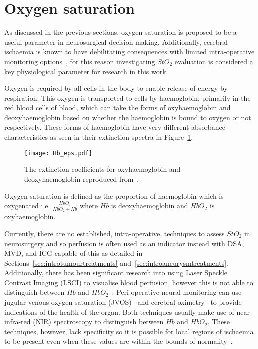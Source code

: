 \section{Oxygen saturation}\label{sec:oxygensat}
As discussed in the previous sections, oxygen saturation is proposed to be a useful parameter in neurosurgical decision making. Additionally, cerebral ischaemia is known to have debilitating consequences with limited intra-operative monitoring options~\citep{Zhou2016}, for this reason investigating $StO_2$ evaluation is considered a key physiological parameter for research in this work. 

Oxygen is required by all cells in the body to enable release of energy by respiration. This oxygen is transported to cells by haemoglobin, primarily in the red blood cells of blood, which can take the forms of oxyhaemoglobin and deoxyhaemoglobin based on whether the haemoglobin is bound to oxygen or not respectively. These forms of haemoglobin have very different absorbance characteristics as seen in their extinction spectra in Figure~\ref{fig:Haemoglobinext}. 
\begin{figure}[h]
    \centering 
    \texttt{[image: Hb\_eps.pdf]}
    \caption{The extinction coefficients for oxyhaemoglobin and deoxyhaemoglobin reproduced from~\citep{Prahl1998}.}
    \label{fig:Haemoglobinext}
\end{figure}
Oxygen saturation is defined as the proportion of haemoglobin which is oxygenated i.e. $\frac{HbO_2}{HbO_2 + Hb}$ where $Hb$ is deoxyhaemoglobin and $HbO_2$ is oxyhaemoglobin. 

Currently, there are no established, intra-operative, techniques to assess $StO_2$ in neurosurgery and so perfusion is often used as an indicator instead with DSA, MVD, and ICG capable of this as detailed in Sections~\ref{sec:introtumourtreatments} and~\ref{sec:introaneurysmtreatments}. Additionally, there has been significant research into using Laser Speckle Contrast Imaging (LSCI) to visualise blood perfusion, however this is not able to distinguish between $Hb$ and $HbO_2$~\citep{Dunn2012, Zhong2021}. Peri-operative neural monitoring can use jugular venous oxygen saturation (JVOS)~\citep{Raith2020} and cerebral oximetry~\citep{Lian2020} to provide indications of the health of the organ. Both techniques usually make use of near infra-red (NIR) spectroscopy to distinguish between $Hb$ and $HbO_2$. These techniques, however, lack specificity so it is possible for local regions of ischaemia to be present even when these values are within the bounds of normality~\citep{Raith2020, Zhong2021}.

